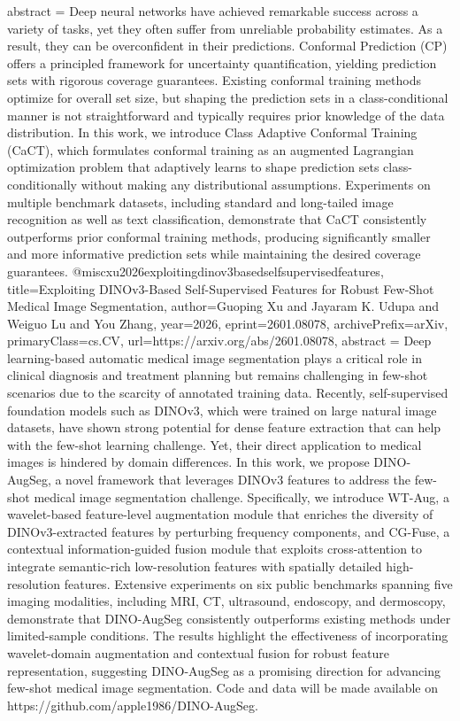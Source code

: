 {      abstract = {Deep neural networks have achieved remarkable success across a variety of tasks, yet they often suffer from unreliable probability estimates. As a result, they can be overconfident in their predictions. Conformal Prediction (CP) offers a principled framework for uncertainty quantification, yielding prediction sets with rigorous coverage guarantees. Existing conformal training methods optimize for overall set size, but shaping the prediction sets in a class-conditional manner is not straightforward and typically requires prior knowledge of the data distribution. In this work, we introduce Class Adaptive Conformal Training (CaCT), which formulates conformal training as an augmented Lagrangian optimization problem that adaptively learns to shape prediction sets class-conditionally without making any distributional assumptions. Experiments on multiple benchmark datasets, including standard and long-tailed image recognition as well as text classification, demonstrate that CaCT consistently outperforms prior conformal training methods, producing significantly smaller and more informative prediction sets while maintaining the desired coverage guarantees.}
}@misc{xu2026exploitingdinov3basedselfsupervisedfeatures,
      title={Exploiting DINOv3-Based Self-Supervised Features for Robust Few-Shot Medical Image Segmentation}, 
      author={Guoping Xu and Jayaram K. Udupa and Weiguo Lu and You Zhang},
      year={2026},
      eprint={2601.08078},
      archivePrefix={arXiv},
      primaryClass={cs.CV},
      url={https://arxiv.org/abs/2601.08078},
      abstract = {Deep learning-based automatic medical image segmentation plays a critical role in clinical diagnosis and treatment planning but remains challenging in few-shot scenarios due to the scarcity of annotated training data. Recently, self-supervised foundation models such as DINOv3, which were trained on large natural image datasets, have shown strong potential for dense feature extraction that can help with the few-shot learning challenge. Yet, their direct application to medical images is hindered by domain differences. In this work, we propose DINO-AugSeg, a novel framework that leverages DINOv3 features to address the few-shot medical image segmentation challenge. Specifically, we introduce WT-Aug, a wavelet-based feature-level augmentation module that enriches the diversity of DINOv3-extracted features by perturbing frequency components, and CG-Fuse, a contextual information-guided fusion module that exploits cross-attention to integrate semantic-rich low-resolution features with spatially detailed high-resolution features. Extensive experiments on six public benchmarks spanning five imaging modalities, including MRI, CT, ultrasound, endoscopy, and dermoscopy, demonstrate that DINO-AugSeg consistently outperforms existing methods under limited-sample conditions. The results highlight the effectiveness of incorporating wavelet-domain augmentation and contextual fusion for robust feature representation, suggesting DINO-AugSeg as a promising direction for advancing few-shot medical image segmentation. Code and data will be made available on https://github.com/apple1986/DINO-AugSeg.}
}
